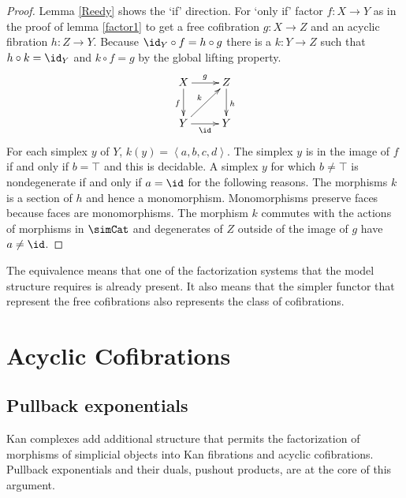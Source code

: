 \documentclass{tac}
\newcommand\of{:}
\newcommand\tuplet[1]{\left\langle #1 \right\rangle}
\begin{document}
\begin{proof} Lemma \ref{Reedy} shows the `if' direction. For `only if' factor $f\of X\to Y$ as in the proof of lemma \ref{factor1} to get a free cofibration $g\of X\to Z$ and an acyclic fibration $h\of Z\to Y$. Because $\id_Y\circ f = h\circ g$ there is a $k\of Y\to Z$ such that $h\circ k = \id_Y$ and $k\circ f = g$ by the global lifting property. 
\[
\xymatrix{
X\ar[d]_f \ar[r]^g & Z\ar[d]^h\\
Y\ar[r]_\id \ar[ur]^k & Y
}
\]
For each simplex $y$ of $Y$, $k(y)=\tuplet{a,b,c,d}$. The simplex $y$ is in the image of $f$ if and only if $b=\top$ and this is decidable. A simplex $y$ for which $b\neq \top$ is nondegenerate if and only if $a=\id$ for the following reasons. The morphisms $k$ is a section of $h$ and hence a monomorphism. Monomorphisms preserve faces because faces are monomorphisms. The morphism $k$ commutes with the actions of morphisms in $\simCat$ and degenerates of $Z$ outside of the image of $g$ have $a\neq\id$.
\end{proof}

The equivalence means that one of the factorization systems that the model structure requires is already present. It also means that the simpler functor that represent the free cofibrations also represents the class of cofibrations.

\section{Acyclic Cofibrations}

\subsection{Pullback exponentials}
Kan complexes add additional structure that permits the factorization of morphisms of simplicial objects into Kan fibrations and acyclic cofibrations. Pullback exponentials and their duals, pushout products, are at the core of this argument.
\end{document}
